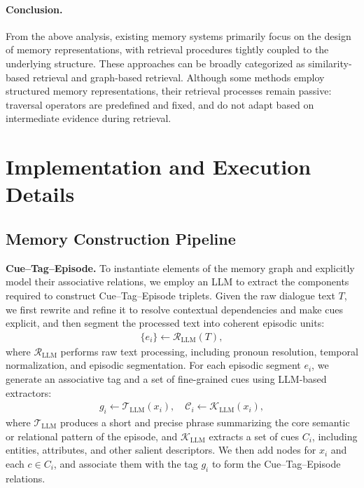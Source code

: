 \paragraph{Conclusion.}
From the above analysis, existing memory systems primarily focus on the design of
memory representations, with retrieval procedures tightly coupled to the
underlying structure.
These approaches can be broadly categorized as similarity-based retrieval and
graph-based retrieval.
Although some methods employ structured memory representations, their retrieval
processes remain passive: traversal operators are predefined and fixed, and do
not adapt based on intermediate evidence during retrieval.



\section{Implementation and Execution Details}
\subsection{Memory Construction Pipeline}
\label{app:memory_system}
\textbf{Cue--Tag--Episode.}
To instantiate elements of the memory graph and explicitly model their associative relations, we employ an LLM to extract the components required to construct Cue--Tag--Episode triplets.
Given the raw dialogue text $T$, we first rewrite and refine it to resolve contextual dependencies and make cues explicit, and then segment the processed text into coherent episodic units:
\begin{align}
\{e_i\} \leftarrow \mathcal{R}_{\text{LLM}}(T),
\end{align}
where $\mathcal{R}_{\text{LLM}}$ performs raw text processing, including pronoun resolution, temporal normalization, and episodic segmentation.
For each episodic segment $e_i$, we generate an associative tag and a set of fine-grained cues using LLM-based extractors:
\begin{align}
g_i \leftarrow \mathcal{T}_{\text{LLM}}(x_i), \quad
\mathcal{C}_i \leftarrow \mathcal{K}_{\text{LLM}}(x_i),
\end{align}
where $\mathcal{T}_{\text{LLM}}$ produces a short and precise phrase summarizing the core semantic or relational pattern of the episode,
and $\mathcal{K}_{\text{LLM}}$ extracts a set of cues $C_i$, including entities, attributes, and other salient descriptors.
We then add nodes for $x_i$ and each $c \in C_i$, and associate them with the tag $g_i$ to form the Cue--Tag--Episode relations.

